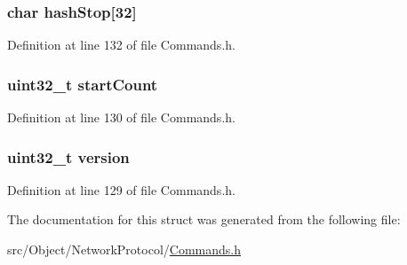 \hypertarget{struct_cmd_get_blocks_aa16ea670ce42c626f461fc49f74ddcd3}{
\subsubsection[{hashStop}]{\setlength{\rightskip}{0pt plus 5cm}char {\bf hashStop}\mbox{[}32\mbox{]}}}
\label{struct_cmd_get_blocks_aa16ea670ce42c626f461fc49f74ddcd3}


Definition at line 132 of file Commands.h.

\hypertarget{struct_cmd_get_blocks_a3393c33019315a8d7ff4d5e48b0577e8}{
\subsubsection[{startCount}]{\setlength{\rightskip}{0pt plus 5cm}uint32\_\-t {\bf startCount}}}
\label{struct_cmd_get_blocks_a3393c33019315a8d7ff4d5e48b0577e8}


Definition at line 130 of file Commands.h.

\hypertarget{struct_cmd_get_blocks_acd99bb05ca015e7d74448acb1deba7ca}{
\subsubsection[{version}]{\setlength{\rightskip}{0pt plus 5cm}uint32\_\-t {\bf version}}}
\label{struct_cmd_get_blocks_acd99bb05ca015e7d74448acb1deba7ca}


Definition at line 129 of file Commands.h.



The documentation for this struct was generated from the following file:\begin{DoxyCompactItemize}
\item 
src/Object/NetworkProtocol/\hyperlink{_commands_8h}{Commands.h}\end{DoxyCompactItemize}

